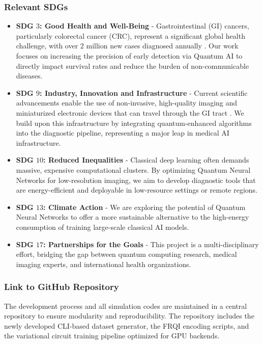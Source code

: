 \documentclass{oqireport}
\begin{document}
\subsubsection*{Relevant SDGs}
    \begin{itemize}
        \item \textbf{SDG $3$: Good Health and Well-Being} - Gastrointestinal (GI) cancers, particularly colorectal cancer (CRC), represent a significant global health challenge, with over $2$ million new cases diagnosed annually \cite{WHO24, UEG24}. Our work focuses on increasing the precision of early detection via Quantum AI to directly impact survival rates and reduce the burden of non-communicable diseases.
        \item \textbf{SDG $9$: Industry, Innovation and Infrastructure} - Current scientific advancements enable the use of non-invasive, high-quality imaging and miniaturized electronic devices that can travel through the GI tract \cite{CAR23}. We build upon this infrastructure by integrating quantum-enhanced algorithms into the diagnostic pipeline, representing a major leap in medical AI infrastructure.
        \item \textbf{SDG $10$: Reduced Inequalities} - Classical deep learning often demands massive, expensive computational clusters. By optimizing Quantum Neural Networks for low-resolution imaging, we aim to develop diagnostic tools that are energy-efficient and deployable in low-resource settings or remote regions.
        \item \textbf{SDG $13$: Climate Action} - We are exploring the potential of Quantum Neural Networks to offer a more sustainable alternative to the high-energy consumption of training large-scale classical AI models.
        \item \textbf{SDG $17$: Partnerships for the Goals} - This project is a multi-disciplinary effort, bridging the gap between quantum computing research, medical imaging experts, and international health organizations.
    \end{itemize}
 

\subsubsection*{Link to GitHub Repository}
    The development process and all simulation codes are maintained in a central repository to ensure modularity and reproducibility. The repository includes the newly developed CLI-based dataset generator, the FRQI encoding scripts, and the variational circuit training pipeline optimized for GPU backends.
    
\end{document}
